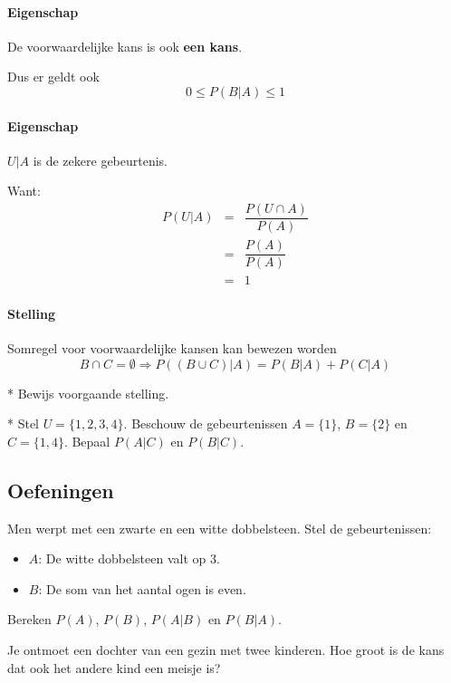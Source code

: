 \documentclass[12pt,twoside]{article}
\begin{document}
\paragraph*{Eigenschap} De voorwaardelijke kans is ook {\bf een kans}.

Dus er geldt ook
$$0\leq P(B|A)\leq 1$$

\paragraph*{Eigenschap} $U|A$ is de zekere gebeurtenis.

Want:
\begin{eqnarray*}
  P(U|A) &=& \dfrac{P(U\cap A)}{P(A)}\\
         &=& \dfrac{P(A)}{P(A)}\\
         &=& 1
\end{eqnarray*}

\paragraph*{Stelling} Somregel voor voorwaardelijke kansen kan bewezen worden
$$B\cap C=\emptyset \Rightarrow P((B\cup C)|A)=P(B|A)+P(C|A)$$

\begin{oefening}*
Bewijs voorgaande stelling.
\end{oefening}

\begin{oefening}*
Stel $U=\{1,2,3,4\}$. Beschouw de gebeurtenissen $A=\{1\}$, $B=\{2\}$ en $C=\{1,4\}$. Bepaal $P(A|C)$ en $P(B|C)$.
\end{oefening}

\subsection{Oefeningen}

\begin{oefening}
Men werpt met een zwarte en een witte dobbelsteen. Stel de gebeurtenissen:
\begin{itemize}
  \item $A$: De witte dobbelsteen valt op 3.
	\item $B$: De som van het aantal ogen is even.
\end{itemize}
Bereken $P(A)$, $P(B)$, $P(A|B)$ en $P(B|A)$.
\end{oefening}

\begin{oefening}
Je ontmoet een dochter van een gezin met twee kinderen. Hoe groot is de kans dat ook het andere kind een meisje is?
\end{oefening}
\end{document}
